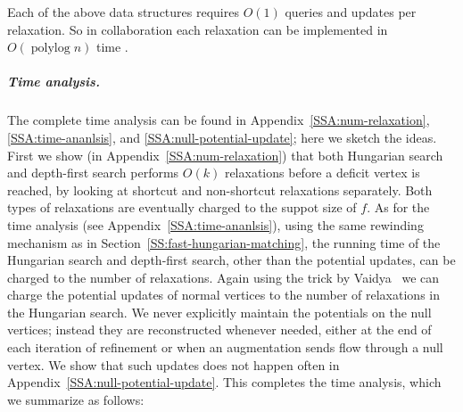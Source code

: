 \documentclass[a4paper,UKenglish]{socg-lipics-v2018}
\def\polylog{\mathop{\mathrm{polylog}}}
\theoremstyle{plain}
\numberwithin{figure}{section}
\renewcommand{\paragraph}{\subparagraph}
\begin{document}
Each of the above data structures requires $O(1)$ queries and updates per relaxation.
So in collaboration each relaxation can be implemented in $O(\polylog n)$ time
\cite{KMRSS17}.




\paragraph{Time analysis.}
The complete time analysis can be found in Appendix~\ref{SSA:num-relaxation}, \ref{SSA:time-ananlsis}, and \ref{SSA:null-potential-update}; here we sketch the ideas.
%
First we show (in Appendix~\ref{SSA:num-relaxation}) that both Hungarian search and depth-first search performs $O(k)$ relaxations before a deficit vertex is reached, by looking at shortcut and non-shortcut relaxations separately.  Both types of relaxations are eventually charged to the suppot size of $f$.
%
As for the time analysis (see Appendix~\ref{SSA:time-ananlsis}), using the same rewinding mechanism as in Section~\ref{SS:fast-hungarian-matching}, the running time of the Hungarian search and depth-first search, other than the potential updates, can be charged to the number of relaxations.
Again using the trick by Vaidya~\cite{Vaidya89}
we can charge the potential updates of normal vertices to the number of relaxations in the Hungarian search.
%
We never explicitly maintain the potentials on the null vertices; instead they are reconstructed whenever needed, either at the end of each iteration of refinement or when an augmentation sends flow through a null vertex.  We show that such updates does not happen often in Appendix~\ref{SSA:null-potential-update}.
%
This completes the time analysis, which we summarize as follows:
\end{document}
